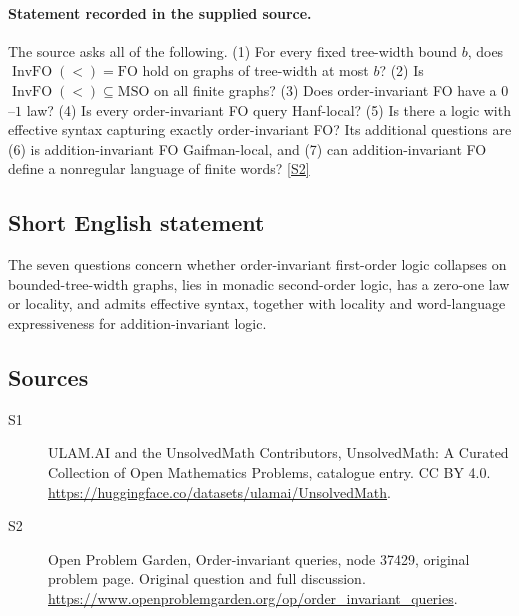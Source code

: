 \documentclass[11pt]{article}
\newcommand{\sref}[2]{\hyperlink{source:#1:#2}{[S#2]}}
\begin{document}
\paragraph{Statement recorded in the supplied source.}
The source asks all of the following. (1) For every fixed tree-width bound $b$, does $\operatorname{InvFO}(<)=\mathrm{FO}$ hold on graphs of tree-width at most $b$? (2) Is $\operatorname{InvFO}(<)\subseteq\mathrm{MSO}$ on all finite graphs? (3) Does order-invariant FO have a $0$--$1$ law? (4) Is every order-invariant FO query Hanf-local? (5) Is there a logic with effective syntax capturing exactly order-invariant FO? Its additional questions are (6) is addition-invariant FO Gaifman-local, and (7) can addition-invariant FO define a nonregular language of finite words? \sref{statement}{2}
\subsection{Short English statement}
The seven questions concern whether order-invariant first-order logic collapses on bounded-tree-width graphs, lies in monadic second-order logic, has a zero-one law or locality, and admits effective syntax, together with locality and word-language expressiveness for addition-invariant logic.
\subsection{Sources}
\begin{description}
\item[\hypertarget{source:statement:1}{S1}] ULAM.AI and the UnsolvedMath Contributors, UnsolvedMath: A Curated Collection of Open Mathematics Problems, catalogue entry. CC BY 4.0. \url{https://huggingface.co/datasets/ulamai/UnsolvedMath}.
\item[\hypertarget{source:statement:2}{S2}] Open Problem Garden, Order-invariant queries, node 37429, original problem page. Original question and full discussion. \url{https://www.openproblemgarden.org/op/order_invariant_queries}.

\end{description}
\label{end:statement}
\end{document}
